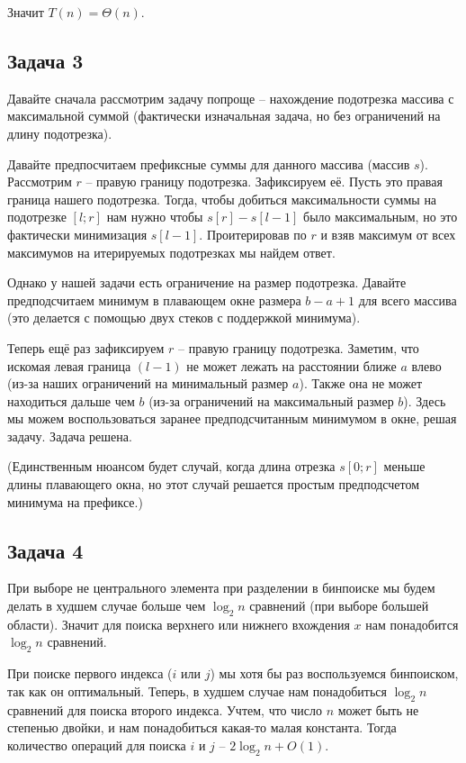 \documentclass{article}
\begin{document}
    Значит $T(n) = \Theta(n)$.

	\subsection*{Задача 3}
	
	\tab Давайте сначала рассмотрим задачу попроще -- нахождение подотрезка массива с максимальной суммой (фактически изначальная задача, но без ограничений на длину подотрезка).
	
	Давайте предпосчитаем префиксные суммы для данного массива (массив $s$).
	Рассмотрим $r$ -- правую границу подотрезка. Зафиксируем её. 
	Пусть это правая граница нашего подотрезка. Тогда, чтобы добиться максимальности суммы на подотрезке $[l; r]$ нам нужно чтобы $s[r] - s[l - 1]$ было максимальным, но это фактически минимизация $s[l - 1]$. Проитерировав по $r$ и взяв максимум от всех максимумов на итерируемых подотрезках мы найдем ответ.
	
	Однако у нашей задачи есть ограничение на размер подотрезка. Давайте  предподсчитаем минимум в плавающем окне размера $b - a + 1$ для всего массива (это делается с помощью двух стеков с поддержкой минимума).
	
	Теперь ещё раз зафиксируем $r$ -- правую границу подотрезка. Заметим, что искомая левая граница $(l - 1)$ не может лежать на расстоянии ближе $a$ влево (из-за наших ограничений на минимальный размер $a$). Также она не может находиться дальше чем $b$ (из-за ограничений на максимальный размер $b$). Здесь мы можем воспользоваться заранее предподсчитанным минимумом в окне, решая задачу. Задача решена.
	
	(Единственным нюансом будет случай, когда длина отрезка $s[0; r]$ меньше длины плавающего окна, но этот случай решается простым предподсчетом минимума на префиксе.)
    
    
	\subsection*{Задача 4}
	
	\tab При выборе не центрального элемента при разделении в бинпоиске мы будем делать в худшем случае больше чем $\log_2 n$ сравнений (при выборе большей области). Значит для поиска верхнего или нижнего вхождения $x$ нам понадобится  $\log_2 n$ сравнений.
	
	При поиске первого индекса ($i$ или $j$) мы хотя бы раз воспользуемся бинпоиском, так как он оптимальный. Теперь, в худшем случае нам понадобиться $\log_2 n$ сравнений для поиска второго индекса. Учтем, что число $n$ может быть не степенью двойки, и нам понадобиться какая-то малая константа. Тогда количество операций для поиска $i$ и $j$ -- $2\log_2 n + O(1)$.
	
\end{document}
